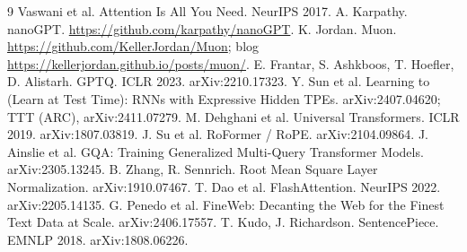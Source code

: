 \documentclass[10pt]{article}
\begin{document}

\begin{thebibliography}{9}
\small
{} Vaswani et al. Attention Is All You Need. NeurIPS 2017.
 A. Karpathy. nanoGPT. \url{https://github.com/karpathy/nanoGPT}.
 K. Jordan. Muon. \url{https://github.com/KellerJordan/Muon}; blog \url{https://kellerjordan.github.io/posts/muon/}.
 E. Frantar, S. Ashkboos, T. Hoefler, D. Alistarh. GPTQ. ICLR 2023. arXiv:2210.17323.
 Y. Sun et al. Learning to (Learn at Test Time): RNNs with Expressive Hidden TPEs. arXiv:2407.04620; TTT (ARC), arXiv:2411.07279.
 M. Dehghani et al. Universal Transformers. ICLR 2019. arXiv:1807.03819.
 J. Su et al. RoFormer / RoPE. arXiv:2104.09864.
 J. Ainslie et al. GQA: Training Generalized Multi-Query Transformer Models. arXiv:2305.13245.
 B. Zhang, R. Sennrich. Root Mean Square Layer Normalization. arXiv:1910.07467.
 T. Dao et al. FlashAttention. NeurIPS 2022. arXiv:2205.14135.
 G. Penedo et al. FineWeb: Decanting the Web for the Finest Text Data at Scale. arXiv:2406.17557.
 T. Kudo, J. Richardson. SentencePiece. EMNLP 2018. arXiv:1808.06226.
\end{thebibliography}
\end{document}
